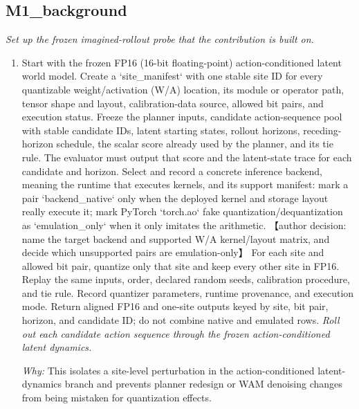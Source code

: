 \documentclass[10pt,a4paper]{article}
\begin{document}
\subsection*{M1\_background}
\emph{Set up the frozen imagined-rollout probe that the contribution is built on.}
\begin{enumerate}[leftmargin=*,start=1]
  \item Start with the frozen FP16 (16-bit floating-point) action-conditioned latent world model. Create a `site\_manifest` with one stable site ID for every quantizable weight/activation (W/A) location, its module or operator path, tensor shape and layout, calibration-data source, allowed bit pairs, and execution status. Freeze the planner inputs, candidate action-sequence pool with stable candidate IDs, latent starting states, rollout horizons, receding-horizon schedule, the scalar score already used by the planner, and its tie rule. The evaluator must output that score and the latent-state trace for each candidate and horizon. Select and record a concrete inference backend, meaning the runtime that executes kernels, and its support manifest: mark a pair `backend\_native` only when the deployed kernel and storage layout really execute it;\allowbreak{} mark PyTorch `torch.ao` fake quantization/dequantization as `emulation\_only` when it only imitates the arithmetic. 【author decision: name the target backend and supported W/A kernel/layout matrix, and decide which unsupported pairs are emulation-only】 For each site and allowed bit pair, quantize only that site and keep every other site in FP16. Replay the same inputs, order, declared random seeds, calibration procedure, and tie rule. Record quantizer parameters, runtime provenance, and execution mode. Return aligned FP16 and one-site outputs keyed by site, bit pair, horizon, and candidate ID;\allowbreak{} do not combine native and emulated rows.
\noindent\emph{Roll out each candidate action sequence through the frozen action-conditioned latent dynamics.}
\par{}
\par\emph{Why:} This isolates a site-level perturbation in the action-conditioned latent-dynamics branch and prevents planner redesign or WAM denoising changes from being mistaken for quantization effects.
\end{enumerate}
\end{document}
